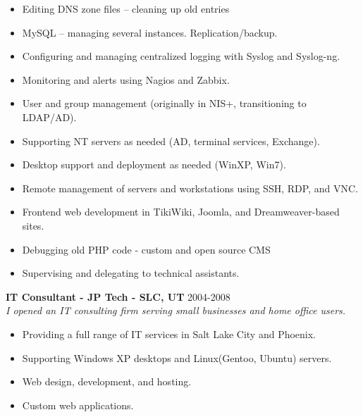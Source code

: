 \documentclass[line,margin]{res}
\begin{document}
\begin{resume}
\begin{itemize}
   \item Editing DNS zone files – cleaning up old entries
   \item MySQL – managing several instances. Replication/backup. 
   \item Configuring and managing centralized logging with Syslog and Syslog-ng.
   \item Monitoring and alerts using Nagios and Zabbix.
   \item User and group management (originally in NIS+, transitioning to LDAP/AD).
   \item Supporting NT servers as needed (AD, terminal services, Exchange).
   \item Desktop support and deployment as needed (WinXP, Win7).
   \item Remote management of servers and workstations using SSH, RDP, and VNC.
   \item Frontend web development in TikiWiki, Joomla, and Dreamweaver-based sites.
   \item Debugging old PHP code - custom and open source CMS
   \item Supervising and delegating to technical assistants.
   \end{itemize}
 {\bf IT Consultant - JP Tech - SLC, UT} \hfill 2004-2008\\
 {\sl I opened an IT consulting firm serving small businesses and home office users.}
  \begin{itemize} \itemsep -2pt
  \item Providing a full range of IT services in Salt Lake City and Phoenix.    
  \item Supporting Windows XP desktops and Linux(Gentoo, Ubuntu) servers.
  \item Web design, development, and hosting.
  \item Custom web applications.
  \end{itemize}


\end{resume}
\end{document}
